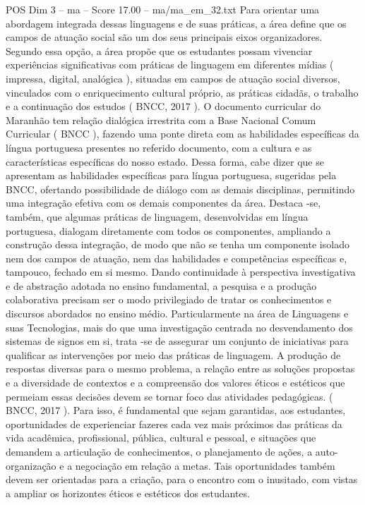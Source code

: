 \begin{textsample}{POS Dim 3 – ma – Score 17.00 – ma/ma\_em\_32.txt}
Para orientar uma abordagem integrada dessas linguagens e de suas práticas, a área define que os campos de atuação social são um dos seus principais eixos organizadores.
Segundo essa opção, a área propõe que os estudantes possam vivenciar experiências significativas com práticas de linguagem em diferentes mídias ( impressa, digital, analógica ), situadas em campos de atuação social diversos, vinculados com o enriquecimento cultural próprio, as práticas cidadãs, o trabalho e a continuação dos estudos ( BNCC, 2017 ).
O documento curricular do Maranhão tem relação dialógica irrestrita com a Base Nacional Comum Curricular ( BNCC ), fazendo uma ponte direta com as habilidades específicas da língua portuguesa presentes no referido documento, com a cultura e as características específicas do nosso estado.
Dessa forma, cabe dizer que se apresentam as habilidades específicas para língua portuguesa, sugeridas pela BNCC, ofertando possibilidade de diálogo com as demais disciplinas, permitindo uma integração efetiva com os demais componentes da área.
Destaca -se, também, que algumas práticas de linguagem, desenvolvidas em língua portuguesa, dialogam diretamente com todos os componentes, ampliando a construção dessa integração, de modo que não se tenha um componente isolado nem dos campos de atuação, nem das habilidades e competências específicas e, tampouco, fechado em si mesmo.
Dando continuidade à perspectiva investigativa e de abstração adotada no ensino fundamental, a pesquisa e a produção colaborativa precisam ser o modo privilegiado de tratar os conhecimentos e discursos abordados no ensino médio.
Particularmente na área de Linguagens e suas Tecnologias, mais do que uma investigação centrada no desvendamento dos sistemas de signos em si, trata -se de assegurar um conjunto de iniciativas para qualificar as intervenções por meio das práticas de linguagem.
A produção de respostas diversas para o mesmo problema, a relação entre as soluções propostas e a diversidade de contextos e a compreensão dos valores éticos e estéticos que permeiam essas decisões devem se tornar foco das atividades pedagógicas. ( BNCC, 2017 ).
Para isso, é fundamental que sejam garantidas, aos estudantes, oportunidades de experienciar fazeres cada vez mais próximos das práticas da vida acadêmica, profissional, pública, cultural e pessoal, e situações que demandem a articulação de conhecimentos, o planejamento de ações, a auto-organização e a negociação em relação a metas.
Tais oportunidades também devem ser orientadas para a criação, para o encontro com o inusitado, com vistas a ampliar os horizontes éticos e estéticos dos estudantes.

\end{textsample}
